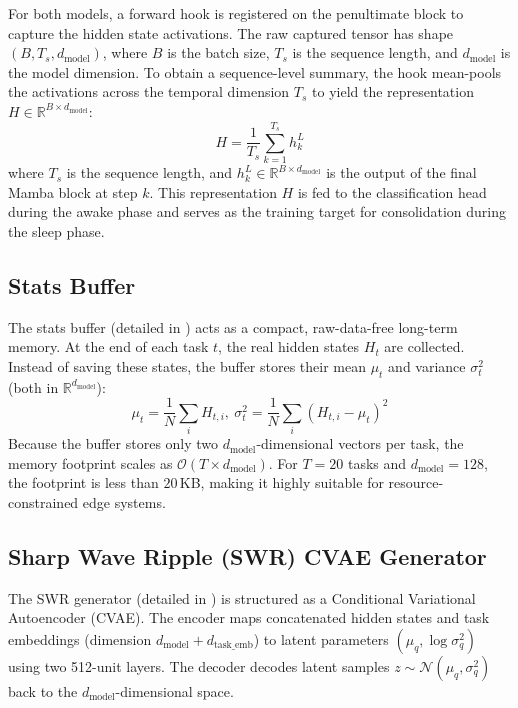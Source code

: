 For both models, a forward hook is registered on the penultimate block to capture the hidden state activations. The raw captured tensor has shape $(B, T_s, d_{\text{model}})$, where $B$ is the batch size, $T_s$ is the sequence length, and $d_{\text{model}}$ is the model dimension. To obtain a sequence-level summary, the hook mean-pools the activations across the temporal dimension $T_s$ to yield the representation $H \in \mathbb{R}^{B \times d_{\text{model}}}$:
\begin{equation}
    H = \frac{1}{T_s} \sum_{k=1}^{T_s} h_k^L
    \label{eq:hidden_extraction}
\end{equation}
where $T_s$ is the sequence length, and $h_k^L \in \mathbb{R}^{B \times d_{\text{model}}}$ is the output of the final Mamba block at step $k$. This representation $H$ is fed to the classification head during the awake phase and serves as the training target for consolidation during the sleep phase.

\subsection{Stats Buffer}
The stats buffer (detailed in ) acts as a compact, raw-data-free long-term memory. At the end of each task $t$, the real hidden states $H_t$ are collected. Instead of saving these states, the buffer stores their mean $\mu_t$ and variance $\sigma_t^2$ (both in $\mathbb{R}^{d_{\text{model}}}$):
\begin{equation}
    \mu_{t} = \frac{1}{N} \sum_{i} H_{t,i}, \ \sigma_{t}^2 = \frac{1}{N} \sum_{i} (H_{t,i} - \mu_{t})^2
    \label{eq:buffer_stats}
\end{equation}
Because the buffer stores only two $d_{\text{model}}$-dimensional vectors per task, the memory footprint scales as $\mathcal{O}(T \times d_{\text{model}})$. For $T=20$ tasks and $d_{\text{model}}=128$, the footprint is less than $20$\,KB, making it highly suitable for resource-constrained edge systems.

\subsection{Sharp Wave Ripple (SWR) CVAE Generator}
The SWR generator (detailed in \allowbreak{}\allowbreak{}\allowbreak{}) is structured as a Conditional Variational Autoencoder (CVAE). The encoder maps concatenated hidden states and task embeddings (dimension $d_{\text{model}} + d_{\text{task\_emb}}$) to latent parameters $(\mu_q, \log\sigma_q^2)$ using two 512-unit layers. The decoder decodes latent samples $z \sim \mathcal{N}(\mu_q, \sigma_q^2)$ back to the $d_{\text{model}}$-dimensional space.


